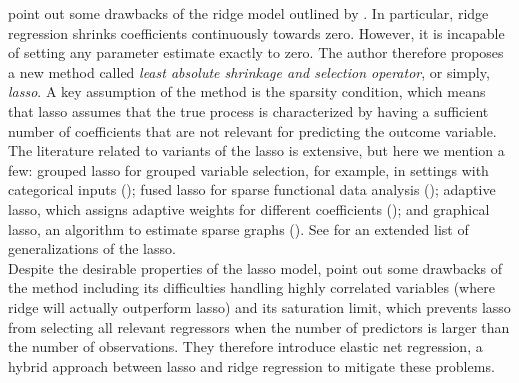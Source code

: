 \noindent \cite{tibshirani1996regression} point out some drawbacks of the ridge model outlined by \cite{hoerl1970ridge1}. In particular, ridge regression shrinks coefficients continuously towards zero. However, it is incapable of setting any parameter estimate exactly to zero. The author therefore proposes a new method called \textit{least absolute shrinkage and
selection operator}, or simply, \textit{lasso}. %
A key assumption of the method is the sparsity condition, which means that lasso assumes that the true process is characterized by having a sufficient number of coefficients that are not relevant for predicting the outcome variable.\\


\noindent The literature related to variants of the lasso is extensive, but here we mention a few: grouped lasso for grouped variable selection, for example, in settings with categorical inputs (\cite{yuan2006model}); fused lasso for sparse functional data analysis (\cite{chen2010graph}); adaptive lasso, which assigns adaptive weights for different coefficients (\cite{zou2006adaptive}); and graphical lasso, an algorithm to estimate sparse graphs (\cite{friedman2008sparse}). See \cite{tibshirani2011regression} for an extended list of generalizations of the lasso. \\

\noindent Despite the desirable properties of the lasso model, \cite{zou2005regularization} point out some drawbacks of the method including its difficulties handling highly correlated variables (where ridge will actually outperform lasso) and its saturation limit, which prevents lasso from  selecting all relevant regressors when the number of predictors is larger than the number of observations. They therefore introduce elastic net regression, a hybrid approach between lasso and ridge regression to mitigate these problems. \\


